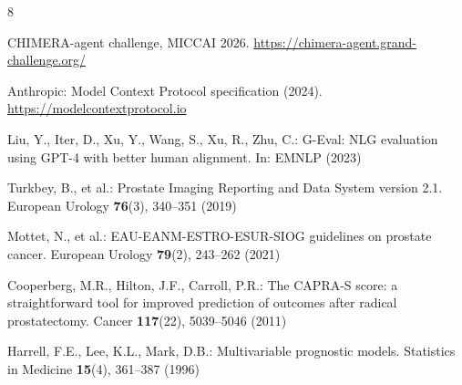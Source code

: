 \documentclass[runningheads]{llncs}
\begin{document}
\begin{thebibliography}{8}

CHIMERA-agent challenge, MICCAI 2026.
\url{https://chimera-agent.grand-challenge.org/}

Anthropic: Model Context Protocol specification (2024).
\url{https://modelcontextprotocol.io}

Liu, Y., Iter, D., Xu, Y., Wang, S., Xu, R., Zhu, C.: G-Eval: NLG evaluation using
GPT-4 with better human alignment. In: EMNLP (2023)

Turkbey, B., et al.: Prostate Imaging Reporting and Data System version 2.1.
European Urology \textbf{76}(3), 340--351 (2019)

Mottet, N., et al.: EAU-EANM-ESTRO-ESUR-SIOG guidelines on prostate cancer.
European Urology \textbf{79}(2), 243--262 (2021)

Cooperberg, M.R., Hilton, J.F., Carroll, P.R.: The CAPRA-S score: a straightforward
tool for improved prediction of outcomes after radical prostatectomy.
Cancer \textbf{117}(22), 5039--5046 (2011)

Harrell, F.E., Lee, K.L., Mark, D.B.: Multivariable prognostic models.
Statistics in Medicine \textbf{15}(4), 361--387 (1996)

\end{thebibliography}
\end{document}
